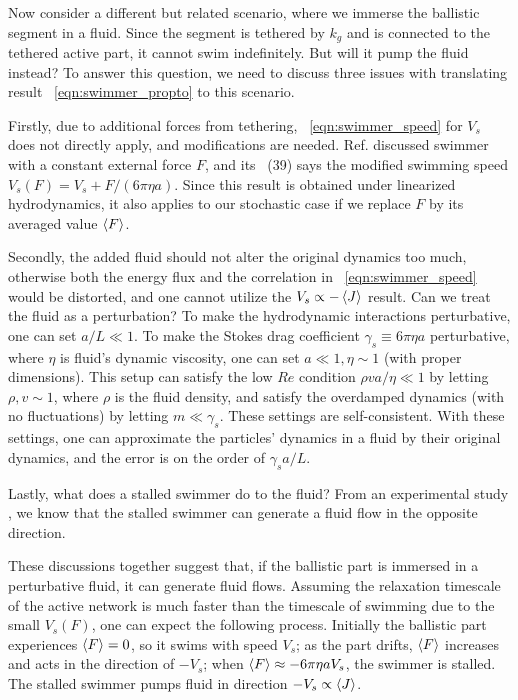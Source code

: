 \documentclass[
 preprint,
 preprintnumbers,
 amsmath,amssymb,
 aps,
 pre,
 longbibliography,
 10pt, twocolumn
]{revtex4-1}
\begin{document}
Now consider a different but related scenario, where we immerse the ballistic segment in a fluid. Since the segment is tethered by $k_g$ and is connected to the tethered active part, it cannot swim indefinitely. But will it pump the fluid instead?
To answer this question, we need to discuss three issues with translating result \eqnname~\eqref{eqn:swimmer_propto} to this scenario.

Firstly, due to additional forces from tethering, \eqnname~\eqref{eqn:swimmer_speed} for $V_s$ does not directly apply, and modifications are needed.
Ref. \cite{Golestanian2008AnalyticNumber} discussed swimmer with a constant external force $F$, and its \eqnname~(39) says the modified swimming speed $V_s(F) = V_s + F/(6\pi\eta a)$. Since this result is obtained under linearized hydrodynamics, it also applies to our stochastic case if we replace $F$ by its averaged value $\expval{F}$.

Secondly, the added fluid should not alter the original dynamics too much, otherwise both the energy flux and the correlation in \eqnname~\eqref{eqn:swimmer_speed} would be distorted, and one cannot utilize the $V_s \propto -\expval{J}$ result. Can we treat the fluid as a perturbation? To make the hydrodynamic interactions perturbative, one can set $a/L \ll 1$. To make the Stokes drag coefficient $\gamma_s \equiv 6\pi\eta a$ perturbative, where $\eta$ is fluid's dynamic viscosity, one can set $a \ll 1, \eta \sim 1$ (with proper dimensions). This setup can satisfy the low $Re$ condition $\rho v a/\eta \ll 1$ by letting $\rho,v \sim 1$, where $\rho$ is the fluid density, and satisfy the overdamped dynamics (with no fluctuations) by letting $m \ll \gamma_s$. 
These settings are self-consistent. With these settings, one can approximate the particles' dynamics in a fluid by their original dynamics, and the error is on the order of $\gamma_s a / L$.

Lastly, what does a stalled swimmer do to the fluid? From an experimental study \cite{Leoni2009ANumber}, we know that the stalled swimmer can generate a fluid flow in the opposite direction.

These discussions together suggest that, if the ballistic part is immersed in a perturbative fluid, it can generate fluid flows.
Assuming the relaxation timescale of the active network is much faster than the timescale of swimming due to the small $V_s(F)$, one can expect the following process. Initially the ballistic part experiences $\expval{F}=0$, so it swims with speed $V_s$; as the part drifts, $\expval{F}$ increases and acts in the direction of $-V_s$; when $\expval{F} \approx -6\pi\eta a V_s$, the swimmer is stalled. The stalled swimmer pumps fluid in direction $-V_s \propto \expval{J}$.
\end{document}
